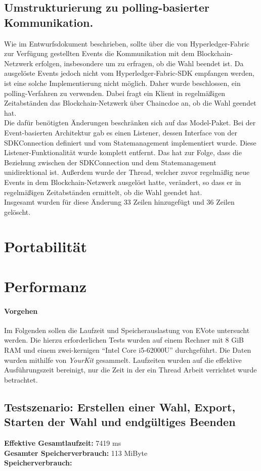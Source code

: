 \documentclass[parskip=full]{scrartcl}
\begin{document}
\subsection{Umstrukturierung zu polling-basierter Kommunikation.}
Wie im Entwurfsdokument beschrieben, sollte über die von Hyperledger-Fabric zur Verfügung gestellten Events die Kommunikation mit dem Blockchain-Netzwerk erfolgen, insbesondere um zu erfragen, ob die Wahl beendet ist. Da ausgelöste Events jedoch nicht vom Hyperledger-Fabric-SDK empfangen werden, ist eine solche Implementierung nicht möglich. Daher wurde beschlossen, ein polling-Verfahren zu verwenden. Dabei fragt ein Klient in regelmäßigen Zeitabständen das Blockchain-Netzwerk über Chaincdoe an, ob die Wahl geendet hat.
\\
Die dafür benötigten Änderungen beschränken sich auf das Model-Paket. Bei der Event-basierten Architektur gab es einen Listener, dessen Interface von der SDKConnection definiert und vom Statemanagement implementiert wurde. Diese Listener-Funktionalität wurde komplett entfernt. Das hat zur Folge, dass die Beziehung zwischen der SDKConnection und dem Statemanagement unidirektional ist. Außerdem wurde der Thread, welcher zuvor regelmäßig neue Events in dem Blockchain-Netzwerk ausgelöst hatte, verändert, so dass er in regelmäßigen Zeitabständen ermittelt, ob die Wahl geendet hat.
\\
Insgesamt wurden für diese Änderung 33 Zeilen hinzugefügt und 36 Zeilen gelöscht.

\section{Portabilität}
\newpage
\section{Performanz}
\paragraph{Vorgehen}
Im Folgenden sollen die Laufzeit und Speicherauslastung von EVote untersucht werden.
Die hierzu erforderlichen Tests wurden auf einem Rechner mit 8 GiB RAM und einem zwei-kernigen \enquote{Intel Core i5-62000U} durchgeführt. Die Daten wurden mithilfe von \textit{YourKit} gesammelt. Laufzeiten wurden auf die effektive Ausführungszeit bereinigt, nur die Zeit in der ein Thread Arbeit verrichtet wurde betrachtet.
\subsection{Testszenario: Erstellen einer Wahl, Export, Starten der Wahl und endgültiges Beenden}
\textbf{Effektive Gesamtlaufzeit:} 7419 ms\\
\textbf{Gesamter Speicherverbrauch:} 113 MiByte \\
\textbf{Speicherverbrauch:}
\end{document}
